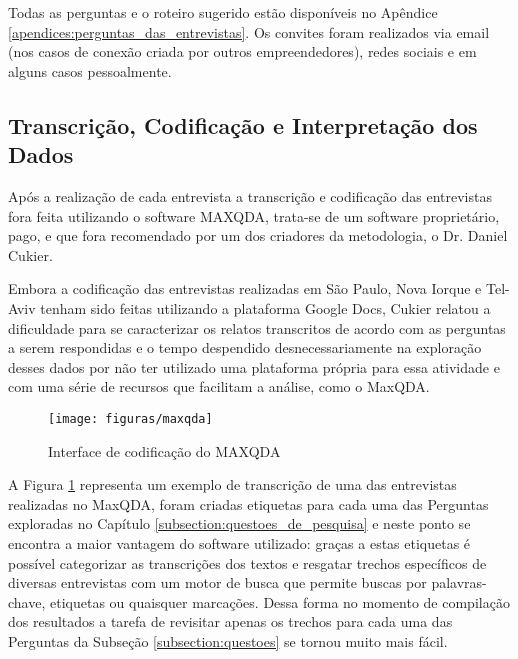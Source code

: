 Todas as perguntas e o roteiro sugerido estão disponíveis no Apêndice \ref{apendices:perguntas_das_entrevistas}. Os convites foram realizados via email (nos casos de conexão criada por outros empreendedores), redes sociais e em alguns casos pessoalmente. 

\subsection{Transcrição, Codificação e Interpretação dos Dados}
\label{subsection:codificacao_e_interpretacao_dos_dados}

Após a realização de cada entrevista a transcrição e codificação das entrevistas fora feita utilizando o software MAXQDA, trata-se de um software proprietário, pago, e que fora recomendado por um dos criadores da metodologia, o Dr. Daniel Cukier. 

Embora a codificação das entrevistas realizadas em São Paulo, Nova Iorque e Tel-Aviv tenham sido feitas utilizando a plataforma Google Docs, Cukier relatou a dificuldade para se caracterizar os relatos transcritos de acordo com as perguntas a serem respondidas e o tempo despendido desnecessariamente na exploração desses dados por não ter utilizado uma plataforma própria para essa atividade e com uma série de recursos que facilitam a análise, como o MaxQDA.

\begin{figure}[!htb]
	\centering
	\texttt{[image: figuras/maxqda]}
	\caption{Interface de codificação do MAXQDA}
	\label{figure:maxqda}
\end{figure}

A Figura \ref{figure:maxqda} representa um exemplo de transcrição de uma das entrevistas realizadas no MaxQDA, foram criadas etiquetas para cada uma das Perguntas exploradas no Capítulo \ref{subsection:questoes_de_pesquisa} e neste ponto se encontra a maior vantagem do software utilizado: graças a estas etiquetas é possível categorizar as transcrições dos textos e resgatar trechos específicos de diversas entrevistas com um motor de busca que permite buscas por palavras-chave, etiquetas ou quaisquer marcações. Dessa forma no momento de compilação dos resultados a tarefa de revisitar apenas os trechos para cada uma das Perguntas da Subseção \ref{subsection:questoes} se tornou muito mais fácil.